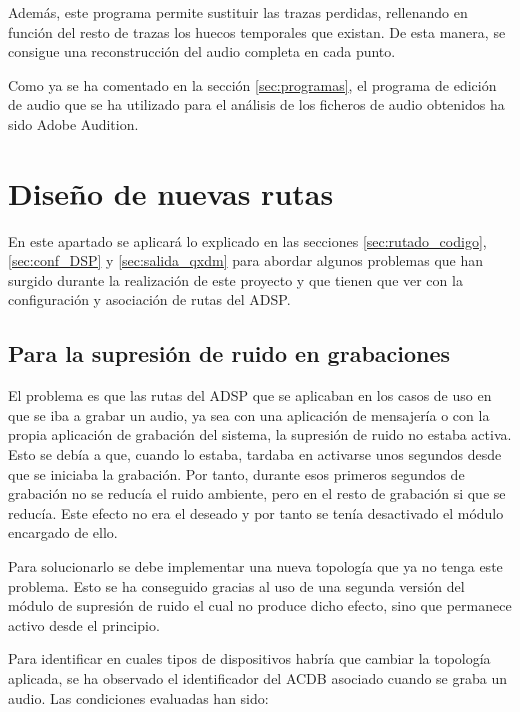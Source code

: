 Además, este programa permite sustituir las trazas perdidas, rellenando en función del resto de trazas los huecos temporales que existan. De esta manera, se consigue una reconstrucción del audio completa en cada punto. 

Como ya se ha comentado en la sección \ref{sec:programas}, el programa de edición de audio que se ha utilizado para el análisis de los ficheros de audio obtenidos ha sido Adobe Audition.

\section{Diseño de nuevas rutas}
En este apartado se aplicará lo explicado en las secciones \ref{sec:rutado_codigo}, \ref{sec:conf_DSP} y \ref{sec:salida_qxdm} para abordar algunos problemas que han surgido durante la realización de este proyecto y que tienen que ver con la configuración y asociación de rutas del \gls{ADSP}. 

\subsection{Para la supresión de ruido en grabaciones} \label{sec:supresion_ruido}
El problema es que las rutas del \gls{ADSP} que se aplicaban en los casos de uso en que se iba a grabar un audio, ya sea con una aplicación de mensajería o con la propia aplicación de grabación del sistema, la supresión de ruido no estaba activa. Esto se debía a que, cuando lo estaba, tardaba en activarse unos segundos desde que se iniciaba la grabación. Por tanto, durante esos primeros segundos de grabación no se reducía el ruido ambiente, pero en el resto de grabación si que se reducía. Este efecto no era el deseado y por tanto se tenía desactivado el módulo encargado de ello.

Para solucionarlo se debe implementar una nueva topología que ya no tenga este problema. Esto se ha conseguido gracias al uso de una segunda versión del módulo de supresión de ruido el cual no produce dicho efecto, sino que permanece activo desde el principio.

Para identificar en cuales tipos de dispositivos habría que cambiar la topología aplicada, se ha observado el identificador del \gls{ACDB} asociado cuando se graba un audio. Las condiciones evaluadas han sido:

